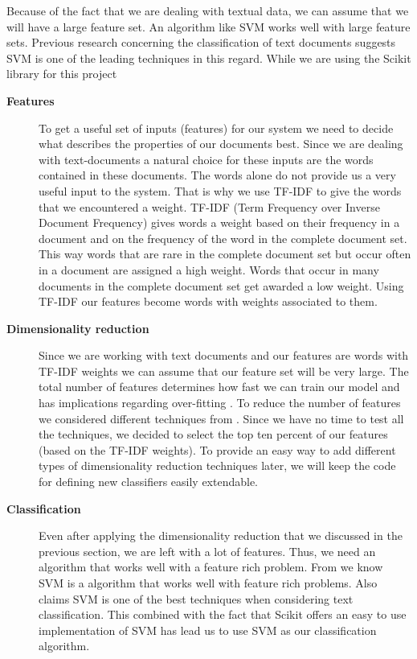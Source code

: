 Because of the fact that we are dealing with textual data, we can assume that we will have a large feature set. An algorithm like SVM \cite{ml_text} works well with large feature sets\cite{MLCheatSheet}.
Previous research concerning the classification of text documents suggests SVM is one of the leading techniques in this regard\cite{ml_text}. While we are using the Scikit library for this project 

\begin{description}
\item[\textbf{Features}] 
To get a useful set of inputs (features) for our system we need to decide what describes the properties of our documents best. Since we are dealing with text-documents a natural choice for these inputs are the words contained in these documents. 
The words alone do not provide us a very useful input to the system. That is why we use TF-IDF to give the words that we encountered a weight. TF-IDF (Term Frequency over Inverse Document Frequency) gives words a weight based on their frequency in a document and on the frequency of the word in the complete document set. This way words that are rare in the complete document set but occur often in a document are assigned a high weight. Words that occur in many documents in the complete document set get awarded a low weight\cite{ramos_tfidf}.
Using TF-IDF our features become words with weights associated to them.

\item[\textbf{Dimensionality reduction}]
Since we are working with text documents and our features are words with TF-IDF weights we can assume that our feature set will be very large. The total number of features determines how fast we can train our model and has implications regarding over-fitting \cite{ml_text}. To reduce the number of features we considered different techniques from \cite{ml_text}. Since we have no time to test all the techniques, we decided to select the top ten percent of our features (based on the TF-IDF weights)\cite{yang1997}. To provide an easy way to add different types of dimensionality reduction techniques later, we will keep the code for defining new classifiers easily extendable.

\item[\textbf{Classification}]
Even after applying the dimensionality reduction that we discussed in the previous section, we are left with a lot of features. Thus, we need an algorithm that works well with a feature rich problem. From \cite{MLCheatSheet} we know SVM is a algorithm that works well with feature rich problems. Also \cite{ml_text} claims SVM is one of the best techniques when considering text classification. This combined with the fact that Scikit offers an easy to use implementation of SVM has lead us to use SVM as our classification algorithm.
\end{description}

